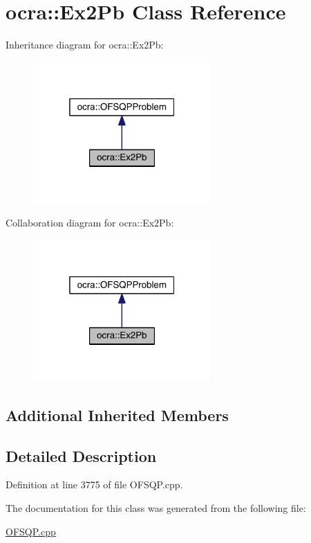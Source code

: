 \hypertarget{classocra_1_1Ex2Pb}{}\section{ocra\+:\+:Ex2\+Pb Class Reference}
\label{classocra_1_1Ex2Pb}


Inheritance diagram for ocra\+:\+:Ex2\+Pb\+:\nopagebreak
\begin{figure}[H]
\begin{center}
\leavevmode
\includegraphics[width=193pt]{dc/de6/classocra_1_1Ex2Pb__inherit__graph}
\end{center}
\end{figure}


Collaboration diagram for ocra\+:\+:Ex2\+Pb\+:\nopagebreak
\begin{figure}[H]
\begin{center}
\leavevmode
\includegraphics[width=193pt]{da/d9a/classocra_1_1Ex2Pb__coll__graph}
\end{center}
\end{figure}
\subsection*{Additional Inherited Members}


\subsection{Detailed Description}


Definition at line 3775 of file O\+F\+S\+Q\+P.\+cpp.



The documentation for this class was generated from the following file\+:\begin{DoxyCompactItemize}
\item 
\hyperlink{OFSQP_8cpp}{O\+F\+S\+Q\+P.\+cpp}\end{DoxyCompactItemize}
